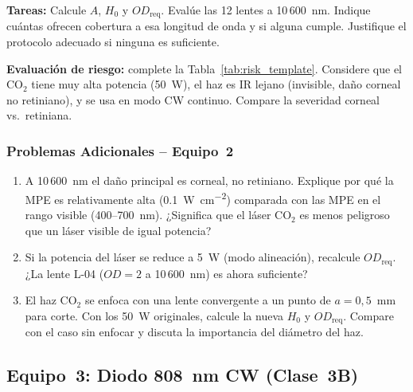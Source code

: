 \documentclass[12pt,a4paper]{article}
\begin{document}
\textbf{Tareas:} Calcule $A$, $H_0$ y $OD_{\mathrm{req}}$. Evalúe las 12
lentes a 10\,600~nm. Indique cuántas ofrecen cobertura a esa longitud de onda
y si alguna cumple. Justifique el protocolo adecuado si ninguna es suficiente.

\textbf{Evaluación de riesgo:} complete la Tabla~\ref{tab:risk_template}.
Considere que el CO$_2$ tiene muy alta potencia (50~W), el haz es IR lejano
(invisible, daño corneal no retiniano), y se usa en modo CW continuo.
Compare la severidad corneal vs.\ retiniana.

\subsubsection*{Problemas Adicionales -- Equipo~2}

\begin{enumerate}
	\item[\textbf{P2.1}] A 10\,600~nm el daño principal es corneal, no
	      retiniano. Explique por qué la MPE es relativamente alta
	      (\SI{0.1}{\watt\per\centi\metre\squared}) comparada con las MPE en
	      el rango visible (400--700~nm). ¿Significa que el láser CO$_2$ es
	      menos peligroso que un láser visible de igual potencia?

	\item[\textbf{P2.2}] Si la potencia del láser se reduce a 5~W (modo
	      alineación), recalcule $OD_{\mathrm{req}}$. ¿La lente L-04
	      ($OD = 2$ a 10\,600~nm) es ahora suficiente?

	\item[\textbf{P2.3}] El haz CO$_2$ se enfoca con una lente convergente a
	      un punto de $a = 0{,}5$~mm para corte. Con los 50~W originales,
	      calcule la nueva $H_0$ y $OD_{\mathrm{req}}$. Compare con el caso
	      sin enfocar y discuta la importancia del diámetro del haz.
\end{enumerate}

\subsection{Equipo~3: Diodo 808~nm CW (Clase~3B)}
\label{sec:eq3}
\end{document}
